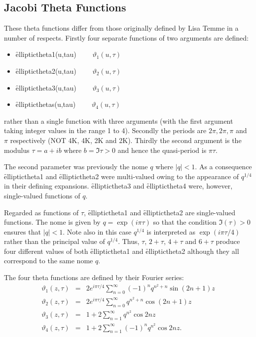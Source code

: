 \subsection{Jacobi Theta Functions}
\hypertarget{JACTF}{}
These theta functions differ from those originally defined by Lisa Temme
in a number of respects.
Firstly four separate functions of two arguments are defined:
\hypertarget{operator:ELLIPTICTHETA1}{}
\hypertarget{operator:ELLIPTICTHETA2}{}
\hypertarget{operator:ELLIPTICTHETA3}{}
\hypertarget{operator:ELLIPTICTHETA4}{}
 
 
\begin{itemize}
\item \f{elliptictheta1(u,tau)} $\qquad \vartheta_1(u, \tau)$
\item \f{elliptictheta2(u,tau)} $\qquad \vartheta_2(u, \tau)$
\item \f{elliptictheta3(u,tau)} $\qquad \vartheta_3(u, \tau)$
\item \f{ellipticthetas(u,tau)} $\qquad \vartheta_4(u, \tau)$
\end{itemize}

rather than a single function with three arguments (with the first argument
taking integer values in the range 1 to 4).
Secondly the periods are $2\pi, 2\pi, \pi$ and $\pi$ respectively
(NOT 4K, 4K, 2K and 2K).
Thirdly the second argument is the modulus $\tau = a+i b$ where $b=\Im\tau>0$
and hence the quasi-period is $\pi\tau$.

The second parameter was previously the nome $q$
where $|q|<1$. As a consequence \f{elliptictheta1} and \f{elliptictheta2} were
multi-valued owing to the appearance of $q^{1/4}$ in their defining expansions.
\f{elliptictheta3} and \f{elliptictheta4} were, however, single-valued
functions of $q$.

Regarded as functions of $\tau$,
\f{elliptictheta1} and \f{elliptictheta2} are single-valued functions. The nome
is given by $q = \exp(i\pi\tau)$  so that the condition $\Im(\tau)>0$ ensures
that $|q| < 1$. Note also  in this case $q^{1/4}$ is interpreted as
$\exp(i\pi\tau/4)$ rather than the principal value of $q^{1/4}$.
Thus, $\tau$, $2+\tau$, $4+\tau$ and $6+\tau$ produce four different values of
both \f{elliptictheta1} and \f{elliptictheta2} although they all correspond to
the same nome $q$.

The four theta functions are defined by their Fourier series:
\begin{eqnarray*}
  \vartheta_1(z,\tau) & = & 2 e^{i\pi\tau/4}\sum_{n=0}^\infty (-1)^nq^{n^2+n} \sin(2n+1)z\\
\vartheta_2(z,\tau) & = & 2 e^{i\pi\tau/4}\sum_{n=0}^\infty q^{n^2+n} \cos(2n+1)z\\
\vartheta_3(z,\tau) & = & 1 +2\sum_{n=1}^\infty q^{n^2} \cos 2n z\\
\vartheta_4(z,\tau) & = & 1 +2\sum_{n=1}^\infty (-1)^n q^{n^2} \cos 2n z.
\end{eqnarray*}

